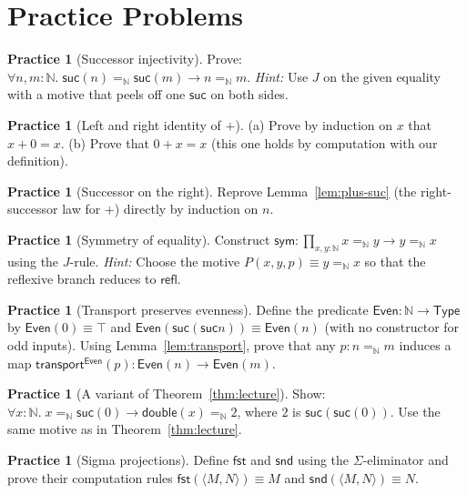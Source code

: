 \documentclass[11pt]{article}
\newcommand{\Type}{\mathsf{Type}}
\newcommand{\Nat}{\mathbb{N}}
\newcommand{\suc}{\mathsf{suc}}
\newcommand{\Id}[3]{#1 =_{#2} #3}
\newcommand{\refl}{\mathsf{refl}}
\newcommand{\transport}{\mathsf{transport}}
\newcommand{\fst}{\mathsf{fst}}
\newcommand{\snd}{\mathsf{snd}}
\newcommand{\pair}[2]{\langle #1,#2\rangle}
\theoremstyle{definition}
\newtheorem{exercise}[definition]{Practice}
\theoremstyle{plain}
\theoremstyle{remark}
\begin{document}
\section{Practice Problems}
\begin{exercise}[Successor injectivity]\label{ex:suc-inj}
Prove: $\forall n,m{:}\Nat.\; \Id{\suc(n)}{\Nat}{\suc(m)} \to \Id{n}{\Nat}{m}$. \emph{Hint:} Use $J$ on the given equality with a motive that peels off one $\suc$ on both sides.
\end{exercise}

\begin{exercise}[Left and right identity of $+$]\label{ex:plus-id}
(a) Prove by induction on $x$ that $x + 0 = x$.\; (b) Prove that $0 + x = x$ (this one holds by computation with our definition).
\end{exercise}

\begin{exercise}[Successor on the right]\label{ex:plus-suc}
Reprove Lemma~\ref{lem:plus-suc} (the right-successor law for $+$) directly by induction on $n$.
\end{exercise}

\begin{exercise}[Symmetry of equality]\label{ex:sym}
Construct $\mathsf{sym} : \prod_{x,y{:}\Nat} \Id{x}{\Nat}{y} \to \Id{y}{\Nat}{x}$ using the $J$-rule. \emph{Hint:} Choose the motive $P(x,y,p) \equiv \Id{y}{\Nat}{x}$ so that the reflexive branch reduces to $\refl$.
\end{exercise}

\begin{exercise}[Transport preserves evenness]\label{ex:even}
Define the predicate $\mathsf{Even} : \Nat \to \Type$ by $\mathsf{Even}(0) \equiv \top$ and $\mathsf{Even}(\suc(\suc n)) \equiv \mathsf{Even}(n)$ (with no constructor for odd inputs). Using Lemma~\ref{lem:transport}, prove that any $p{:}\Id{n}{\Nat}{m}$ induces a map $\transport^{\mathsf{Even}}(p) : \mathsf{Even}(n) \to \mathsf{Even}(m)$.
\end{exercise}

\begin{exercise}[A variant of Theorem~\ref{thm:lecture}]\label{ex:double-two}
Show: $\forall x{:}\Nat.\; \Id{x}{\Nat}{\suc(0)} \to \Id{\mathsf{double}(x)}{\Nat}{2}$, where $2$ is $\suc(\suc(0))$. Use the same motive as in Theorem~\ref{thm:lecture}.
\end{exercise}

\begin{exercise}[Sigma projections]\label{ex:sigma-proj}
Define $\fst$ and $\snd$ using the $\Sigma$-eliminator and prove their computation rules $\fst(\pair{M}{N}) \equiv M$ and $\snd(\pair{M}{N}) \equiv N$.
\end{exercise}
\end{document}
